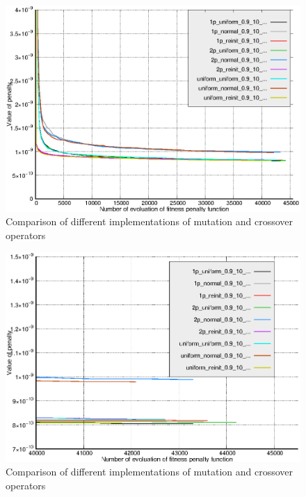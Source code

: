 \documentclass[12pt]{report}
\begin{document}
\begin{figure}
    \centering
    \includegraphics[width=5.0in]{operators_comparison_orient}
    \caption{Comparison of different implementations of mutation and crossover operators}
    \label{operatorcomparisonorient}
\end{figure}

\begin{figure}
    \centering
    \includegraphics[width=5.0in]{operators_comparison_zoom_orient}
    \caption{Comparison of different implementations of mutation and crossover operators}
    \label{operatorcomparisonorientzoom}
\end{figure}
\end{document}
